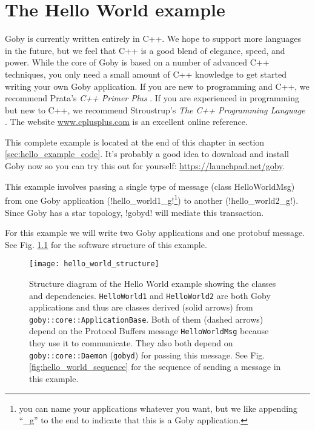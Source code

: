 \chapter{The Hello World example}
\MakeShortVerb{\!} %

Goby is currently written entirely in C++. We hope to support more languages in the future, but we feel that C++ is a good blend of elegance, speed, and power. While the core of Goby is based on a number of advanced C++ techniques, you only need a small amount of C++ knowledge to get started writing your own Goby application. If you are new to programming and C++, we recommend Prata's \textit{C++ Primer Plus} \cite{Prata:2001:CPP:515923}. If you are experienced in programming but new to C++, we recommend Stroustrup's \textit{The C++ Programming Language} \cite{Stroustrup:2000:CPL:518791}. The website \url{www.cplusplus.com} is an excellent online reference.

This complete example is located at the end of this chapter in section \ref{sec:hello_example_code}. It's probably a good idea to download and install Goby now so you can try this out for yourself: \url{https://launchpad.net/goby}.

This example involves passing a single type of message (class HelloWorldMsg) from one Goby application (!hello_world1_g!\footnote{you can name your applications whatever you want, but we like appending ``\_g'' to the end to indicate that this is a Goby application.}) to another (!hello_world2_g!). Since Goby has a \gls{star topology}, !gobyd! will mediate this transaction.

For this example we will write two Goby applications and one \gls{protobuf} message. See Fig. \ref{fig:hello_world_structure} for the software structure of this example.

\begin{figure}
\centering
\texttt{[image: hello\_world\_structure]}
\caption{Structure diagram of the Hello World example showing the classes and dependencies. \texttt{HelloWorld1} and \texttt{HelloWorld2} are both Goby applications and thus are classes derived (solid arrows) from \texttt{goby::core::ApplicationBase}. Both of them (dashed arrows) depend on the Protocol Buffers message \texttt{HelloWorldMsg} because they use it to communicate. They also both depend on \texttt{goby::core::Daemon} (\texttt{gobyd}) for passing this message. See Fig. \ref{fig:hello_world_sequence} for the sequence of sending a message in this example.}
\label{fig:hello_world_structure}
\end{figure}


